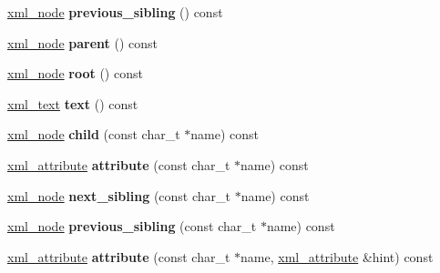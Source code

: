 \begin{DoxyCompactItemize}
\hyperlink{classpugi_1_1xml__node}{xml\+\_\+node} {\bfseries previous\+\_\+sibling} () const
\item 
\mbox{\label{classpugi_1_1xml__node_a4b1b05e5951b5a60b3e0a7ea8652b086}} 
\hyperlink{classpugi_1_1xml__node}{xml\+\_\+node} {\bfseries parent} () const
\item 
\mbox{\label{classpugi_1_1xml__node_af51bed73940fd904c68aceea1de696f7}} 
\hyperlink{classpugi_1_1xml__node}{xml\+\_\+node} {\bfseries root} () const
\item 
\mbox{\label{classpugi_1_1xml__node_a70ea66295ac1fe677bbace3d118826d3}} 
\hyperlink{classpugi_1_1xml__text}{xml\+\_\+text} {\bfseries text} () const
\item 
\mbox{\label{classpugi_1_1xml__node_a1e23e9720c90ef764197f1e0c71aa287}} 
\hyperlink{classpugi_1_1xml__node}{xml\+\_\+node} {\bfseries child} (const char\+\_\+t $\ast$name) const
\item 
\mbox{\label{classpugi_1_1xml__node_ac0234bad0db50690f5bc97d0788303ad}} 
\hyperlink{classpugi_1_1xml__attribute}{xml\+\_\+attribute} {\bfseries attribute} (const char\+\_\+t $\ast$name) const
\item 
\mbox{\label{classpugi_1_1xml__node_a2b5f05fa7087ac46159348f584d36103}} 
\hyperlink{classpugi_1_1xml__node}{xml\+\_\+node} {\bfseries next\+\_\+sibling} (const char\+\_\+t $\ast$name) const
\item 
\mbox{\label{classpugi_1_1xml__node_aef0e24e5c2022049d0c13e3cd49f1682}} 
\hyperlink{classpugi_1_1xml__node}{xml\+\_\+node} {\bfseries previous\+\_\+sibling} (const char\+\_\+t $\ast$name) const
\item 
\mbox{\label{classpugi_1_1xml__node_aa4a02a006fee2527d249365c72393a56}} 
\hyperlink{classpugi_1_1xml__attribute}{xml\+\_\+attribute} {\bfseries attribute} (const char\+\_\+t $\ast$name, \hyperlink{classpugi_1_1xml__attribute}{xml\+\_\+attribute} \&hint) const
\item 
\mbox{\label{classpugi_1_1xml__node_a9c2581317b217e618f682c74a9154f0d}} 

\end{DoxyCompactItemize}
